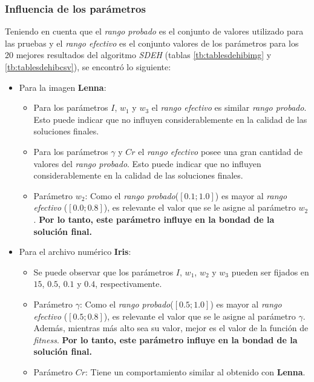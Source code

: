 \subsubsection{Influencia de los parámetros}

Teniendo en cuenta que el \emph{rango probado} es el conjunto de valores utilizado
para las pruebas y el \emph{rango efectivo} es el conjunto valores de los parámetros
para los 20 mejores resultados del algoritmo \emph{SDEH} (tablas \ref{tb:tablesdehibimg}
y \ref{tb:tablesdehibcsv}), se encontró lo siguiente:

\begin{itemize}
    \item Para la imagen {\bf Lenna}:
		\begin{itemize}
		    \item Para los parámetros $I$, $w_1$ y $w_3$ el \emph{rango efectivo}
				  es similar \emph{rango probado}. Esto
				  puede indicar que no influyen considerablemente en la calidad
				  de las soluciones finales.
		    \item Para los parámetros $\gamma$ y $Cr$  el \emph{rango efectivo} 
		          posee una gran cantidad de valores del \emph{rango probado}.
		          Esto puede indicar que no influyen considerablemente en la
		          calidad de las soluciones finales.
		    \item Parámetro $w_2$:
		          Como el \emph{rango probado}($[0.1; 1.0]$) es
		          mayor al \emph{rango efectivo} ($[0.0;0.8]$), es relevante el valor que se
		          le asigne al parámetro $w_2$. \textbf{Por lo tanto, este
		          parámetro influye en la bondad de la solución final.}
	    \end{itemize}
    
    \item Para el archivo numérico {\bf Iris}:
		\begin{itemize}
			\item Se puede observar que los parámetros $I$, $w_1$, $w_2$ y $w_3$
			  	  pueden ser fijados en  $15$, $0.5$, $0.1$ y $0.4$,
				  respectivamente. 
		    \item Parámetro $\gamma$:
		          Como el \emph{rango probado}($[0.5; 1.0]$) es
		          mayor al \emph{rango efectivo} ($[0.5;0.8]$), es relevante el valor que se
		          le asigne al parámetro $\gamma$. Además, mientras más alto
		          sea su valor, mejor es el valor de la función de \emph{fitness}.
		           \textbf{Por lo tanto, este
		          parámetro influye en la bondad de la solución final.}
		    \item Parámetro $Cr$:
		    	  Tiene un comportamiento similar al obtenido con \textbf{Lenna}.
		\end{itemize}
\end{itemize}

